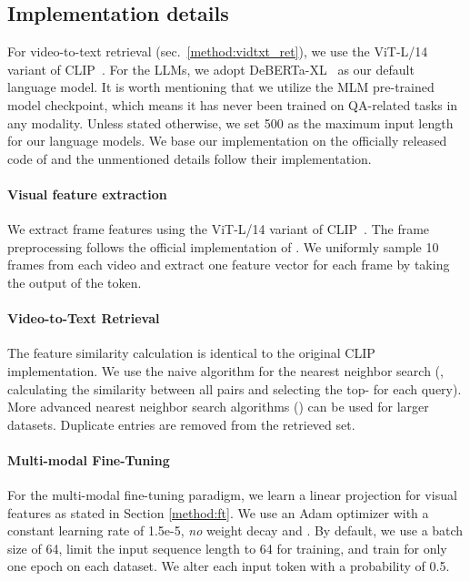 \subsection{Implementation details}
\label{subsec:implementation}

For video-to-text retrieval (sec.~\ref{method:vidtxt_ret}), we use the ViT-L/14 variant of CLIP~\cite{clip}. For the LLMs, we adopt DeBERTa-XL~\cite{deberta} as our default language model. 
It is worth mentioning that we utilize the MLM pre-trained model checkpoint, which means it has never been trained on QA-related tasks in any modality. Unless stated otherwise, we set 500 as the maximum input length for our language models. We base our implementation on the officially released code of \cite{frozenbilm} and the unmentioned details follow their implementation. 


\vspace{-3mm}

\paragraph{Visual feature extraction} We extract frame features using the ViT-L/14 variant of CLIP~\cite{clip}. The frame preprocessing follows the official implementation of \cite{clip}. We uniformly sample 10 frames from each video and extract one feature vector for each frame by taking the output of the  token. 


\vspace{-3mm}

\paragraph{Video-to-Text Retrieval} The feature similarity calculation is identical to the original CLIP implementation. We use the naive algorithm for the nearest neighbor search (\ie, calculating the similarity between all pairs and selecting the top- for each query).  
More advanced nearest neighbor search algorithms (\eg \cite{guo2020accelerating}) can be used for larger datasets.  Duplicate entries are removed from the retrieved set.


\vspace{-3.5mm}

\paragraph{Multi-modal Fine-Tuning} 
For the multi-modal fine-tuning paradigm, we learn a linear projection for visual features as stated in Section \ref{method:ft}. We use an Adam optimizer with a constant learning rate of 1.5e-5, {\it no} weight decay and . By default, we use a batch size of 64, limit the input sequence length to 64 for training, and train for only one epoch on each dataset. We alter each input token with a probability of 0.5. 


